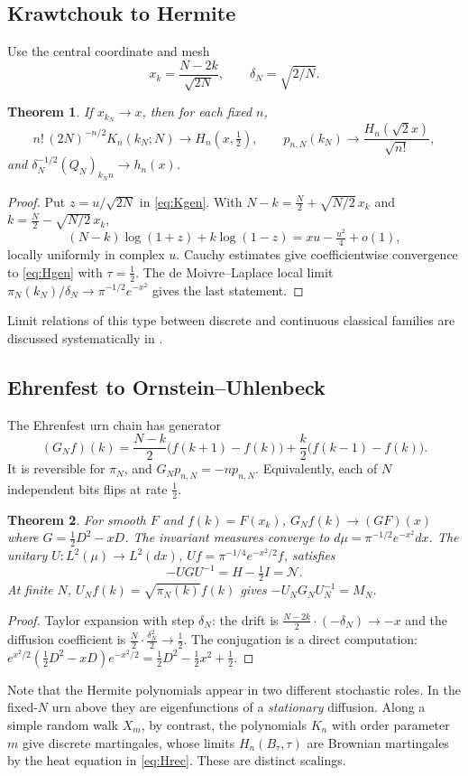\documentclass[11pt,reqno]{amsart}
\newtheorem{theorem}{Theorem}[section]
\theoremstyle{definition}
\theoremstyle{remark}
\newcommand{\NN}{\mathcal N}
\newcommand{\Id}{I}
\begin{document}
\subsection{Krawtchouk to Hermite}
Use the central coordinate and mesh
\begin{equation}\label{eq:scale}
x_k=\frac{N-2k}{\sqrt{2N}},\qquad\delta_N=\sqrt{2/N}.
\end{equation}
\begin{theorem}\label{thm:KH}
If $x_{k_N}\to x$, then for each fixed $n$,
\[
n!\,(2N)^{-n/2}K_n(k_N;N)\to H_n(x,\tfrac12),\qquad
p_{n,N}(k_N)\to\frac{H_n(\sqrt2x)}{\sqrt{n!}},
\]
and $\delta_N^{-1/2}(Q_N)_{k_Nn}\to h_n(x)$.
\end{theorem}
\begin{proof}
Put $z=u/\sqrt{2N}$ in \eqref{eq:Kgen}. With $N-k=\frac N2+\sqrt{N/2}\,x_k$
and $k=\frac N2-\sqrt{N/2}\,x_k$,
\[
(N-k)\log(1+z)+k\log(1-z)=xu-\tfrac{u^2}4+o(1),
\]
locally uniformly in complex $u$. Cauchy estimates give coefficientwise
convergence to \eqref{eq:Hgen} with $\tau=\frac12$. The de Moivre--Laplace
local limit $\pi_N(k_N)/\delta_N\to\pi^{-1/2}e^{-x^2}$ gives the last
statement.
\end{proof}
Limit relations of this type between discrete and continuous classical
families are discussed systematically in \cite{GodoyEtAl1998}.

\subsection{Ehrenfest to Ornstein--Uhlenbeck}
The Ehrenfest urn chain has generator
\begin{equation}\label{eq:GN}
(G_Nf)(k)=\frac{N-k}2\big(f(k+1)-f(k)\big)+\frac k2\big(f(k-1)-f(k)\big).
\end{equation}
It is reversible for $\pi_N$, and $G_Np_{n,N}=-np_{n,N}$. Equivalently,
each of $N$ independent bits flips at rate $\frac12$.
\begin{theorem}\label{thm:OU}
For smooth $F$ and $f(k)=F(x_k)$,
$G_Nf(k)\to(GF)(x)$ where $G=\frac12D^2-xD$. The invariant measures
converge to $d\mu=\pi^{-1/2}e^{-x^2}dx$. The unitary
$U:L^2(\mu)\to L^2(dx)$, $Uf=\pi^{-1/4}e^{-x^2/2}f$, satisfies
\[
-UGU^{-1}=H-\tfrac12\Id=\NN.
\]
At finite $N$, $U_Nf(k)=\sqrt{\pi_N(k)}f(k)$ gives $-U_NG_NU_N^{-1}=M_N$.
\end{theorem}
\begin{proof}
Taylor expansion with step $\delta_N$: the drift is
$\frac{N-2k}{2}\cdot(-\delta_N)\to-x$ and the diffusion coefficient is
$\frac N2\cdot\frac{\delta_N^2}{2}\to\frac12$. The conjugation is a
direct computation: $e^{x^2/2}(\frac12D^2-xD)e^{-x^2/2}=\frac12D^2-\frac12x^2+\frac12$.
\end{proof}
Note that the Hermite polynomials appear in two different stochastic
roles. In the fixed-$N$ urn above they are eigenfunctions of a
\emph{stationary} diffusion. Along a simple random walk $X_m$, by
contrast, the polynomials $K_n$ with order parameter $m$ give discrete
martingales, whose limits $H_n(B_\tau,\tau)$ are Brownian martingales by
the heat equation in \eqref{eq:Hrec}. These are distinct scalings.
\end{document}
